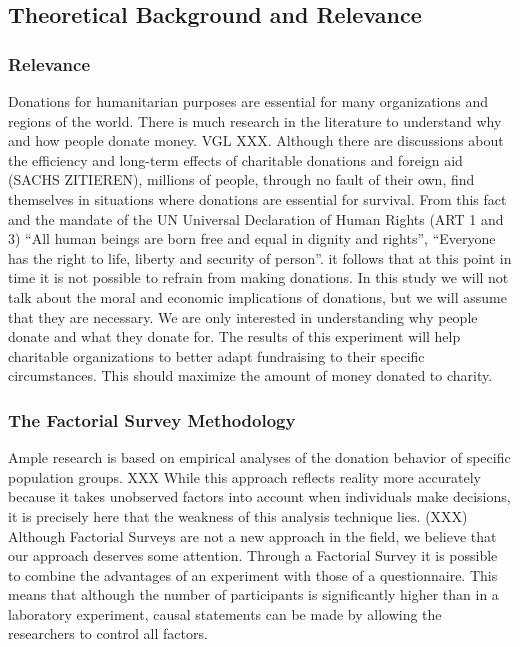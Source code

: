 \documentclass[
  12pt,
]{article}
\begin{document}
\hypertarget{theoretical-background-and-relevance}{%
\subsection{Theoretical Background and
Relevance}\label{theoretical-background-and-relevance}}

\hypertarget{relevance}{%
\subsubsection{Relevance}\label{relevance}}

Donations for humanitarian purposes are essential for many organizations
and regions of the world. There is much research in the literature to
understand why and how people donate money. VGL XXX. Although there are
discussions about the efficiency and long-term effects of charitable
donations and foreign aid (SACHS ZITIEREN), millions of people, through
no fault of their own, find themselves in situations where donations are
essential for survival. From this fact and the mandate of the UN
Universal Declaration of Human Rights (ART 1 and 3) ``All human beings
are born free and equal in dignity and rights'', ``Everyone has the
right to life, liberty and security of person''. it follows that at this
point in time it is not possible to refrain from making donations. In
this study we will not talk about the moral and economic implications of
donations, but we will assume that they are necessary. We are only
interested in understanding why people donate and what they donate for.
The results of this experiment will help charitable organizations to
better adapt fundraising to their specific circumstances. This should
maximize the amount of money donated to charity.

\hypertarget{the-factorial-survey-methodology}{%
\subsubsection{The Factorial Survey
Methodology}\label{the-factorial-survey-methodology}}

Ample research is based on empirical analyses of the donation behavior
of specific population groups. XXX While this approach reflects reality
more accurately because it takes unobserved factors into account when
individuals make decisions, it is precisely here that the weakness of
this analysis technique lies. (XXX) Although Factorial Surveys are not a
new approach in the field, we believe that our approach deserves some
attention. Through a Factorial Survey it is possible to combine the
advantages of an experiment with those of a questionnaire. This means
that although the number of participants is significantly higher than in
a laboratory experiment, causal statements can be made by allowing the
researchers to control all factors.
\end{document}
